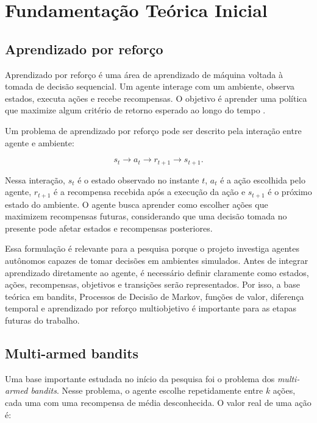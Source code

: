 \chapter{Fundamentação Teórica Inicial}

\section{Aprendizado por reforço}

Aprendizado por reforço é uma área de aprendizado de máquina voltada à tomada
de decisão sequencial.
Um agente interage com um ambiente, observa estados, executa ações e recebe
recompensas.
O objetivo é aprender uma política que maximize algum critério de retorno esperado
ao longo do tempo \cite{sutton2018}.

Um problema de aprendizado por reforço pode ser descrito pela interação entre
agente e ambiente:

\begin{equation}
s_t \rightarrow a_t \rightarrow r_{t+1} \rightarrow s_{t+1}.
\end{equation}

Nessa interação, $s_t$ é o estado observado no instante $t$, $a_t$ é a ação
escolhida pelo agente, $r_{t+1}$ é a recompensa recebida após a execução da
ação e $s_{t+1}$ é o próximo estado do ambiente.
O agente busca aprender como escolher ações que maximizem recompensas futuras,
considerando que uma decisão tomada no presente pode afetar estados e recompensas
posteriores.

Essa formulação é relevante para a pesquisa porque o projeto investiga agentes
autônomos capazes de tomar decisões em ambientes simulados.
Antes de integrar aprendizado diretamente ao agente, é necessário definir
claramente como estados, ações, recompensas, objetivos e transições serão
representados.
Por isso, a base teórica em bandits, Processos de Decisão de Markov, funções de
valor, diferença temporal e aprendizado por reforço multiobjetivo é importante
para as etapas futuras do trabalho.

\section{Multi-armed bandits}

Uma base importante estudada no início da pesquisa foi o problema dos
\textit{multi-armed bandits}.
Nesse problema, o agente escolhe repetidamente entre $k$ ações, cada uma
com uma recompensa de média desconhecida.
O valor real de uma ação é:


